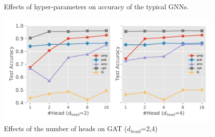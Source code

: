 \begin{figure}[H]
    \centering
    \\
    \\
    \caption{Effects of hyper-parameters on accuracy of the typical GNNs.}
    \label{fig:exp_hyperparameter_accuracy}
\end{figure}

\begin{figure}[H]
    \centering
    \includegraphics[width=0.5\columnwidth]{figs/experiments/exp_hyperparameter_on_accuracy_gat_small_info.pdf}
    \caption{Effects of the number of heads on GAT ($d_{head}$=2,4)}
    \label{fig:exp_hyperparameter_accuracy_gat_small_info}
\end{figure}

